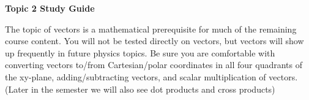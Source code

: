 \documentclass[11pt]{article}
\begin{document}
{\centering
\textbf{Topic 2 Study Guide} \par
\vspace{\baselineskip}
}

The topic of vectors is a mathematical prerequisite for much of the remaining course content.
You will not be tested directly on vectors, but vectors will show up frequently in future physics topics.
Be sure you are comfortable with converting vectors to/from Cartesian/polar coordinates in all four quadrants of the xy-plane, adding/subtracting vectors, and scalar multiplication of vectors.
(Later in the semester we will also see dot products and cross products)
\end{document}
